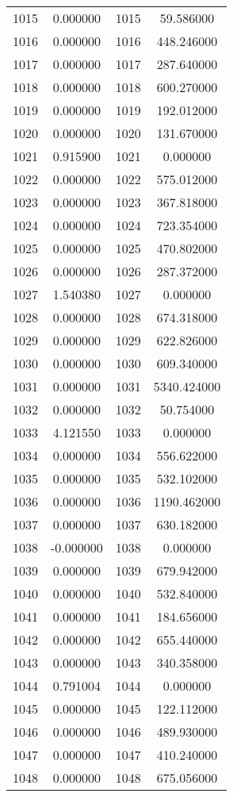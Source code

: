 \documentclass[12pt]{article}
\begin{document}
\begin{longtable}{@{}cccc@{}}
1015 & 0.000000 & 1015 & 59.586000 \\
1016 & 0.000000 & 1016 & 448.246000 \\
1017 & 0.000000 & 1017 & 287.640000 \\
1018 & 0.000000 & 1018 & 600.270000 \\
1019 & 0.000000 & 1019 & 192.012000 \\
1020 & 0.000000 & 1020 & 131.670000 \\
1021 & 0.915900 & 1021 & 0.000000 \\
1022 & 0.000000 & 1022 & 575.012000 \\
1023 & 0.000000 & 1023 & 367.818000 \\
1024 & 0.000000 & 1024 & 723.354000 \\
1025 & 0.000000 & 1025 & 470.802000 \\
1026 & 0.000000 & 1026 & 287.372000 \\
1027 & 1.540380 & 1027 & 0.000000 \\
1028 & 0.000000 & 1028 & 674.318000 \\
1029 & 0.000000 & 1029 & 622.826000 \\
1030 & 0.000000 & 1030 & 609.340000 \\
1031 & 0.000000 & 1031 & 5340.424000 \\
1032 & 0.000000 & 1032 & 50.754000 \\
1033 & 4.121550 & 1033 & 0.000000 \\
1034 & 0.000000 & 1034 & 556.622000 \\
1035 & 0.000000 & 1035 & 532.102000 \\
1036 & 0.000000 & 1036 & 1190.462000 \\
1037 & 0.000000 & 1037 & 630.182000 \\
1038 & -0.000000 & 1038 & 0.000000 \\
1039 & 0.000000 & 1039 & 679.942000 \\
1040 & 0.000000 & 1040 & 532.840000 \\
1041 & 0.000000 & 1041 & 184.656000 \\
1042 & 0.000000 & 1042 & 655.440000 \\
1043 & 0.000000 & 1043 & 340.358000 \\
1044 & 0.791004 & 1044 & 0.000000 \\
1045 & 0.000000 & 1045 & 122.112000 \\
1046 & 0.000000 & 1046 & 489.930000 \\
1047 & 0.000000 & 1047 & 410.240000 \\
1048 & 0.000000 & 1048 & 675.056000 \\

\end{longtable}
\end{document}
